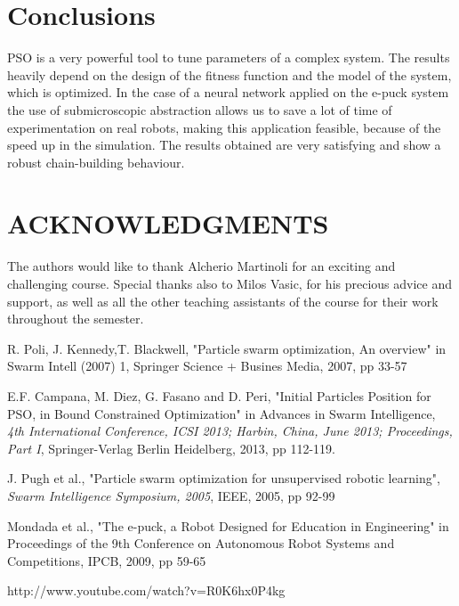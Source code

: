 \documentclass[a4paper, 10pt, conference]{ieeeconf}      %
\begin{document}
\section{Conclusions}
PSO is a very powerful tool to tune parameters of a complex system. The results heavily depend on the design of the fitness function and the model of the system, which is optimized. In the case of a neural network applied on the e-puck system the use of submicroscopic abstraction allows us to save a lot of time of experimentation on real robots, making this application feasible, because of the speed up in the simulation.
The results obtained are very satisfying and show a robust chain-building behaviour.
\section{ACKNOWLEDGMENTS}
The authors would like to thank Alcherio Martinoli for an exciting and challenging course. Special thanks also to Milos Vasic, for his precious advice and support, as well as all the other teaching assistants of the course for their work throughout the semester.

\begin{thebibliography}{99}
R. Poli, J. Kennedy,T. Blackwell, "Particle swarm optimization, An overview" in Swarm Intell (2007) 1, Springer Science + Busines Media, 2007, pp 33-57

E.F. Campana, M. Diez, G. Fasano and D. Peri, "Initial Particles Position for PSO,
in Bound Constrained Optimization" in Advances in Swarm Intelligence, {\it 4th International Conference, ICSI 2013; Harbin, China, June 2013; Proceedings, Part I}, Springer-Verlag Berlin Heidelberg, 2013, pp 112-119.

 J. Pugh et al., "Particle swarm optimization for unsupervised robotic learning", \textit{Swarm Intelligence Symposium, 2005}, IEEE, 2005, pp 92-99


Mondada et al., "The e-puck, a Robot Designed for Education in Engineering" in Proceedings of the 9th Conference on Autonomous Robot Systems and Competitions, IPCB, 2009, pp 59-65 

 http://www.youtube.com/watch?v=R0K6hx0P4kg

\end{thebibliography}
\end{document}
